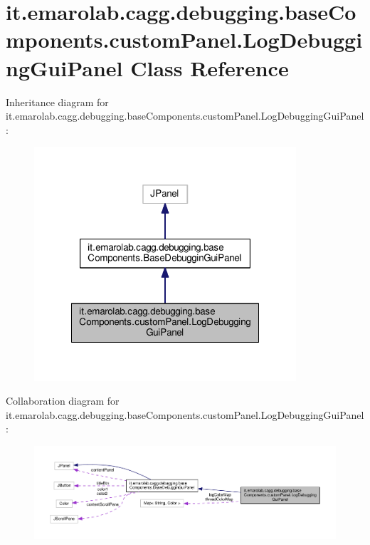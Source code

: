 \hypertarget{classit_1_1emarolab_1_1cagg_1_1debugging_1_1baseComponents_1_1customPanel_1_1LogDebuggingGuiPanel}{\section{it.\-emarolab.\-cagg.\-debugging.\-base\-Components.\-custom\-Panel.\-Log\-Debugging\-Gui\-Panel Class Reference}
\label{classit_1_1emarolab_1_1cagg_1_1debugging_1_1baseComponents_1_1customPanel_1_1LogDebuggingGuiPanel}
}


Inheritance diagram for it.\-emarolab.\-cagg.\-debugging.\-base\-Components.\-custom\-Panel.\-Log\-Debugging\-Gui\-Panel\-:\nopagebreak
\begin{figure}[H]
\begin{center}
\leavevmode
\includegraphics[width=276pt]{classit_1_1emarolab_1_1cagg_1_1debugging_1_1baseComponents_1_1customPanel_1_1LogDebuggingGuiPanel__inherit__graph}
\end{center}
\end{figure}


Collaboration diagram for it.\-emarolab.\-cagg.\-debugging.\-base\-Components.\-custom\-Panel.\-Log\-Debugging\-Gui\-Panel\-:\nopagebreak
\begin{figure}[H]
\begin{center}
\leavevmode
\includegraphics[width=350pt]{classit_1_1emarolab_1_1cagg_1_1debugging_1_1baseComponents_1_1customPanel_1_1LogDebuggingGuiPanel__coll__graph}
\end{center}
\end{figure}
